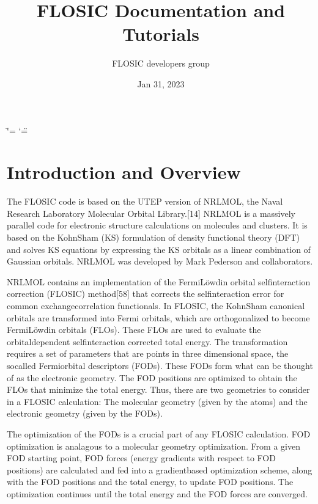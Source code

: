 \documentclass[letterpaper,10pt,english,openany,oneside]{sphinxmanual}
\title{FLOSIC Documentation and Tutorials }
\date{Jan 31, 2023}
\author{  FLOSIC developers group }
\begin{document}
\ifdefined\shorthandoff
  \ifnum\catcode`\=\string=\active\shorthandoff{=}\fi
  \ifnum\catcode`\"=\active{}\fi
\fi

\pagestyle{empty}
\sphinxmaketitle
\pagestyle{plain}
\sphinxtableofcontents
\pagestyle{normal}
\label{\detokenize{main::doc}}


\sphinxstepscope


\chapter{Introduction and Overview}
\label{\detokenize{index:introduction-and-overview}}\label{\detokenize{index:formatting-text}}\label{\detokenize{index::doc}}
\sphinxAtStartPar
The FLOSIC code is based on the UTEP version of NRLMOL, the Naval Research
Laboratory Molecular Orbital Library.{[}1\sphinxhyphen{}4{]}
NRLMOL is a massively parallel code for electronic structure calculations on molecules and clusters.
It is based on the Kohn\sphinxhyphen{}Sham (KS) formulation of density functional theory (DFT) and solves KS equations by expressing
the KS orbitals as a linear combination of Gaussian orbitals. NRLMOL was developed by Mark Pederson and collaborators.

\sphinxAtStartPar
NRLMOL contains an implementation of the Fermi\sphinxhyphen{}Löwdin orbital self\sphinxhyphen{}interaction correction (FLO\sphinxhyphen{}SIC) method{[}5\sphinxhyphen{}8{]}
that corrects the self\sphinxhyphen{}interaction error for common exchange\sphinxhyphen{}correlation functionals.
In FLO\sphinxhyphen{}SIC, the Kohn\sphinxhyphen{}Sham canonical orbitals are transformed into Fermi orbitals, which are orthogonalized to become Fermi\sphinxhyphen{}Löwdin orbitals (FLOs).
These FLOs are used to evaluate the orbital\sphinxhyphen{}dependent self\sphinxhyphen{}interaction corrected total energy. The transformation requires
a set of parameters that are points in three dimensional space, the so\sphinxhyphen{}called
Fermi\sphinxhyphen{}orbital descriptors (FODs). These FODs form what can be thought of as the electronic geometry.
The FOD positions are optimized to obtain the FLOs that minimize the total energy.
Thus, there are two geometries to consider in a FLOSIC calculation: The molecular geometry (given by the atoms) and the electronic geometry (given by the FODs).

\sphinxAtStartPar
The optimization of the FODs is a crucial part of any FLO\sphinxhyphen{}SIC calculation.
FOD optimization is analagous to a molecular geometry optimization. From a given FOD starting point,
FOD forces (energy gradients with respect to FOD positions)
are calculated and fed into a gradient\sphinxhyphen{}based optimization scheme,
along with the FOD positions and the total energy, to update FOD positions.
The optimization continues until the total energy and the FOD forces are converged.
\end{document}
